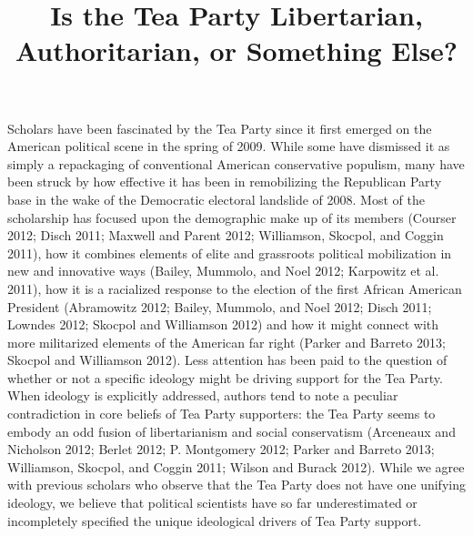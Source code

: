 \documentclass[12pt,]{article}
\title{Is the Tea Party Libertarian, Authoritarian, or Something Else?
\vspace{1.25em}}
\author{}
\date{}
\begin{document}
\maketitle


\doublespacing

Scholars have been fascinated by the Tea Party since it first emerged on
the American political scene in the spring of 2009. While some have
dismissed it as simply a repackaging of conventional American
conservative populism, many have been struck by how effective it has
been in remobilizing the Republican Party base in the wake of the
Democratic electoral landslide of 2008. Most of the scholarship has
focused upon the demographic make up of its members (Courser 2012; Disch
2011; Maxwell and Parent 2012; Williamson, Skocpol, and Coggin 2011),
how it combines elements of elite and grassroots political mobilization
in new and innovative ways (Bailey, Mummolo, and Noel 2012; Karpowitz et
al. 2011), how it is a racialized response to the election of the first
African American President (Abramowitz 2012; Bailey, Mummolo, and Noel
2012; Disch 2011; Lowndes 2012; Skocpol and Williamson 2012) and how it
might connect with more militarized elements of the American far right
(Parker and Barreto 2013; Skocpol and Williamson 2012). Less attention
has been paid to the question of whether or not a specific ideology
might be driving support for the Tea Party. When ideology is explicitly
addressed, authors tend to note a peculiar contradiction in core beliefs
of Tea Party supporters: the Tea Party seems to embody an odd fusion of
libertarianism and social conservatism (Arceneaux and Nicholson 2012;
Berlet 2012; P. Montgomery 2012; Parker and Barreto 2013; Williamson,
Skocpol, and Coggin 2011; Wilson and Burack 2012). While we agree with
previous scholars who observe that the Tea Party does not have one
unifying ideology, we believe that political scientists have so far
underestimated or incompletely specified the unique ideological drivers
of Tea Party support.
\end{document}
